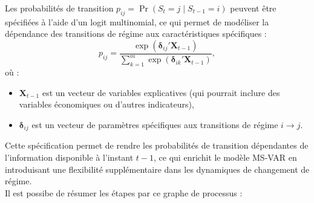\begin{sloppypar}
Les probabilités de transition \( p_{ij} = \Pr(S_t = j \mid S_{t-1} = i) \) peuvent être spécifiées à l'aide d'un logit multinomial, ce qui permet de modéliser la dépendance des transitions de régime aux caractéristiques spécifiques :
\[
p_{ij} = \frac{\exp(\bm{\delta}_{ij}' \bm{X}_{t-1})}{\displaystyle{\sum_{k=1}^m \exp(\bm{\delta}_{ik}' \bm{X}_{t-1})}},
\]
où :
\begin{itemize}
    \item \( \bm{X}_{t-1} \) est un vecteur de variables explicatives (qui pourrait inclure des variables économiques ou d'autres indicateurs),
    \item \( \bm{\delta}_{ij} \) est un vecteur de paramètres spécifiques aux transitions de régime \( i \rightarrow j \).
\end{itemize}

Cette spécification permet de rendre les probabilités de transition dépendantes de l'information disponible à l’instant \( t-1 \), ce qui enrichit le modèle MS-VAR en introduisant une flexibilité supplémentaire dans les dynamiques de changement de régime.\\ 

Il est possibe de résumer les étapes par ce graphe de processus :\\



\end{sloppypar}
